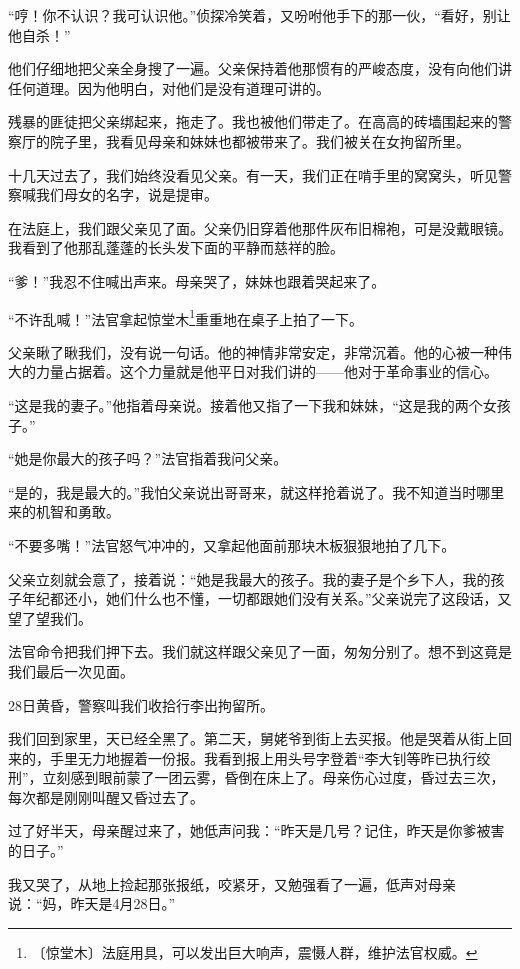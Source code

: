 \documentclass[12pt,UTF-8,openany]{ctexbook}
\begin{document}
\begin{Large}
    “哼！你不认识？我可认识他。”侦探冷笑着，又吩咐他手下的那一伙，“看好，别让他自杀！”
    
    他们仔细地把父亲全身搜了一遍。父亲保持着他那惯有的严峻态度，没有向他们讲任何道理。因为他明白，对他们是没有道理可讲的。
    
    残暴的匪徒把父亲绑起来，拖走了。我也被他们带走了。在高高的砖墙围起来的警察厅的院子里，我看见母亲和妹妹也都被带来了。我们被关在女拘留所里。
    
    十几天过去了，我们始终没看见父亲。有一天，我们正在啃手里的窝窝头，听见警察喊我们母女的名字，说是提审。
    
    在法庭上，我们跟父亲见了面。父亲仍旧穿着他那件灰布旧棉袍，可是没戴眼镜。我看到了他那乱蓬蓬的长头发下面的平静而慈祥的脸。
    
    “爹！”我忍不住喊出声来。母亲哭了，妹妹也跟着哭起来了。
    
    “不许乱喊！”法官拿起惊堂木\footnote{〔惊堂木〕法庭用具，可以发出巨大响声，震慑人群，维护法官权威。}重重地在桌子上拍了一下。
    
    父亲瞅了瞅我们，没有说一句话。他的神情非常安定，非常沉着。他的心被一种伟大的力量占据着。这个力量就是他平日对我们讲的——他对于革命事业的信心。
    
    “这是我的妻子。”他指着母亲说。接着他又指了一下我和妹妹，“这是我的两个女孩子。”
    
    “她是你最大的孩子吗？”法官指着我问父亲。
    
    “是的，我是最大的。”我怕父亲说出哥哥来，就这样抢着说了。我不知道当时哪里来的机智和勇敢。
    
    “不要多嘴！”法官怒气冲冲的，又拿起他面前那块木板狠狠地拍了几下。
    
    父亲立刻就会意了，接着说：“她是我最大的孩子。我的妻子是个乡下人，我的孩子年纪都还小，她们什么也不懂，一切都跟她们没有关系。”父亲说完了这段话，又望了望我们。
    
    法官命令把我们押下去。我们就这样跟父亲见了一面，匆匆分别了。想不到这竟是我们最后一次见面。
    
    28日黄昏，警察叫我们收拾行李出拘留所。
    
    我们回到家里，天已经全黑了。第二天，舅姥爷到街上去买报。他是哭着从街上回来的，手里无力地握着一份报。我看到报上用头号字登着“李大钊等昨已执行绞刑”，立刻感到眼前蒙了一团云雾，昏倒在床上了。母亲伤心过度，昏过去三次，每次都是刚刚叫醒又昏过去了。
    
    过了好半天，母亲醒过来了，她低声问我：“昨天是几号？记住，昨天是你爹被害的日子。”
    
    我又哭了，从地上捡起那张报纸，咬紧牙，又勉强看了一遍，低声对母亲说：“妈，昨天是4月28日。”
    
\end{Large}
\end{document}
